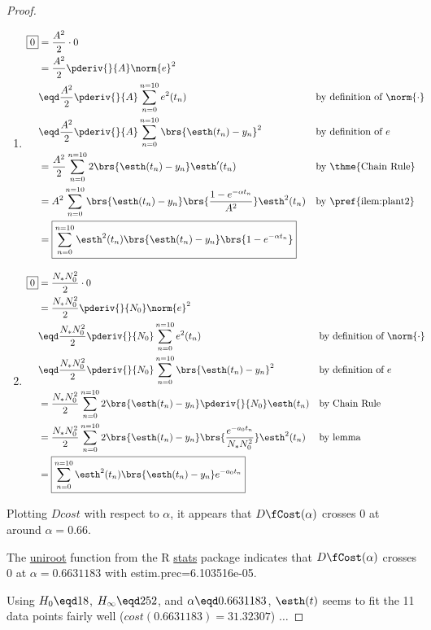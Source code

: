 \begin{proof}
\begin{enumerate}
  \item 
    \begin{align*}
    \boxed{0}
      &= \frac{A^2}{2}\cdot0
    \\&=\frac{A^2}{2}
         \pderiv{}{A}\norm{e}^2
    \\&\eqd \frac{A^2}{2}
         \pderiv{}{A}\sum_{n=0}^{n=10}e^2(t_n)
      && \text{by definition of $\norm{\cdot}$}
    \\&\eqd \frac{A^2}{2}
         \pderiv{}{A}\sum_{n=0}^{n=10}\brs{\esth(t_n)-y_n}^2
      && \text{by definition of $e$}
    \\&= \frac{A^2}{2}
         \sum_{n=0}^{n=10}2\brs{\esth(t_n)-y_n}\esth'(t_n)
      && \text{by \thme{Chain Rule}}
    \\&= A^2
         \sum_{n=0}^{n=10}  \brs{\esth(t_n)-y_n}
                            \brs{\frac{1 - e^{-\alpha t_n}}{A^2}} \esth^2(t_n)
      && \text{by \pref{ilem:plant2}}
    \\&= \boxed{\sum_{n=0}^{n=10} \esth^2(t_n) \brs{\esth(t_n)-y_n} \brs{1 - e^{-\alpha t_n} }}
    \end{align*}

  \item 
    \begin{align*}
    \boxed{0}
      &= \frac{N_*N_0^2}{2}\cdot0
    \\&=\frac{N_*N_0^2}{2}
         \pderiv{}{N_0}\norm{e}^2
    \\&\eqd \frac{N_*N_0^2}{2}
         \pderiv{}{N_0}\sum_{n=0}^{n=10}e^2(t_n)
      && \text{by definition of $\norm{\cdot}$}
    \\&\eqd \frac{N_*N_0^2}{2}
         \pderiv{}{N_0}\sum_{n=0}^{n=10}\brs{\esth(t_n)-y_n}^2
      && \text{by definition of $e$}
    \\&= \frac{N_*N_0^2}{2}
         \sum_{n=0}^{n=10}2\brs{\esth(t_n)-y_n} \pderiv{}{N_0}\esth(t_n)
      && \text{by Chain Rule}
    \\&= \frac{N_*N_0^2}{2}
         \sum_{n=0}^{n=10}2\brs{\esth(t_n)-y_n} \brs{ \frac{e^{-a_0 t_n}}{N_*N_0^2}}\esth^2(t_n)
      && \text{by lemma}
    \\&= \boxed{\sum_{n=0}^{n=10} \esth^2(t_n)\brs{\esth(t_n)-y_n} e^{-a_0 t_n} }
    \end{align*}
\end{enumerate}

Plotting $Dcost$ with respect to $\alpha $, it appears that $D\fCost(\alpha )$ crosses $0$ at around $\alpha =0.66$.

The \href{https://www.rdocumentation.org/packages/stats/versions/3.6.2/topics/uniroot}{uniroot} function from the R 
\href{https://www.rdocumentation.org/packages/stats/versions/3.6.2}{stats} package indicates that $D\fCost(\alpha )$ crosses $0$ 
at $\alpha =0.6631183$ with estim.prec=6.103516e-05.

Using $H_0\eqd18$, $H_{\infty}\eqd252$, and $\alpha \eqd0.6631183$, $\esth(t)$ 
seems to fit the 11 data points fairly well ($cost(0.6631183)=31.32307$) $\ldots$

\end{proof}


